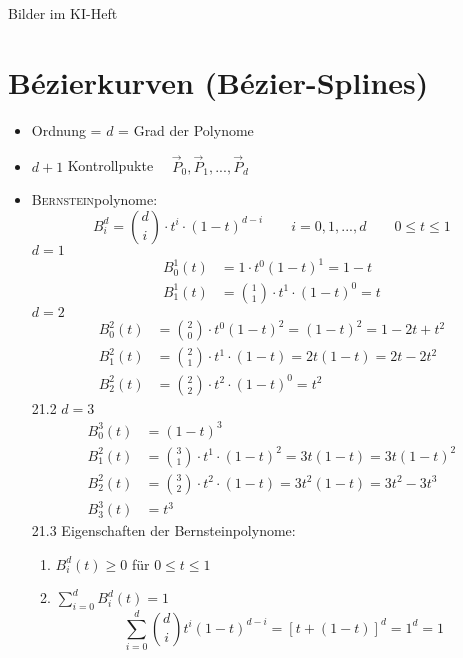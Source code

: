Bilder im KI-Heft
\section{Bézierkurven (Bézier-Splines)}
\begin{itemize}
 \item Ordnung = $d$ = Grad der Polynome
 \item $d + 1$ Kontrollpukte $\quad \vec P_0, \vec P_1, ..., \vec P_d$
 \item \textsc{Bernstein}polynome:
	\[\boxed{B^d_i = \binom{d}{i} \cdot t^i \cdot (1-t)^{d-i}}\qquad i = 0,1,...,d \qquad 0 \le t \le 1\]
	 $d = 1$ %
		\begin{align*}
		 B_0^1(t) &= 1 \cdot t^0 (1-t)^1 = 1-t\\
		 B_1^1(t) &= \binom{1}{1} \cdot t^1 \cdot (1-t)^0 = t
		\end{align*}
	 $d = 2$ %
		\begin{align*}
		 B_0^2(t) &= \binom{2}{0} \cdot t^0 (1-t)^2 = (1-t)^2 = 1-2t+t^2\\
		 B_1^2(t) &= \binom{2}{1} \cdot t^1 \cdot (1-t) = 2t(1-t) = 2t-2t^2\\
		 B_2^2(t) &= \binom{2}{2} \cdot t^2 \cdot (1-t)^0 = t^2
		\end{align*}
		21.2
	 $d = 3$ %
		\begin{align*}
		B_0^3(t) &= (1-t)^3\\
		 B_1^2(t) &= \binom{3}{1} \cdot t^1 \cdot (1-t)^2 = 3t(1-t) = 3t(1-t)^2\\
		 B_2^2(t) &= \binom{3}{2} \cdot t^2 \cdot (1-t) = 3t^2(1-t) = 3t^2 - 3t^3\\
		 B_3^3(t) &= t^3
		\end{align*}
		21.3	
	Eigenschaften der Bernsteinpolynome:
	\begin{enumerate}
	 \item $B_i^d(t) \ge 0$ für $0 \le t \le 1$
	 \item $\boxed{\sum\limits_{i=0}^{d} B_i^d(t) = 1}$
		\Bew	\[\sum\limits_{i=0}^{d} \binom{d}{i} t^i (1-t)^{d-i} = [t + (1-t)]^d = 1^d = 1\]

\end{enumerate}
\end{itemize}
